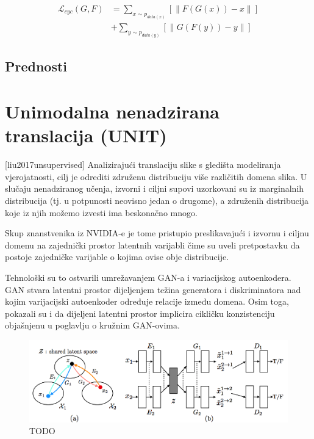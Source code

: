 \documentclass[lmodern, utf8, seminar]{fer}
\newcommand{\Lagr}{\mathcal{L}}
\begin{document}
\begin{equation}
\begin{split}
\Lagr_{cyc}(G, F) &= \sum_{x\sim p_{data(x)}}[ \parallel F(G(x)) - x \parallel ] \\
			   &+ \sum_{y\sim p_{data(y)}}[ \parallel G(F(y)) - y \parallel ]
\end{split}
\end{equation}

\subsection{Prednosti}



\newpage
\section{Unimodalna nenadzirana translacija (UNIT)} [liu2017unsupervised]
Analizirajući translaciju slike s gledišta modeliranja vjerojatnosti, cilj je odrediti združenu distribuciju više različitih domena slika. U slučaju nenadziranog učenja, izvorni i ciljni supovi uzorkovani su iz marginalnih distribucija (tj. u potpunosti neovisno jedan o drugome), a združenih distribucija koje iz njih možemo izvesti ima beskonačno mnogo.

Skup znanstvenika iz NVIDIA-e je tome pristupio preslikavajući i izvornu i ciljnu domenu na zajednički prostor latentnih varijabli čime su uveli pretpostavku da postoje zajedničke varijable o kojima ovise obje distribucije. 

Tehnološki su to ostvarili umrežavanjem GAN-a i variacijskog autoenkodera. GAN stvara latentni prostor dijeljenjem težina generatora i diskriminatora nad kojim varijacijski autoenkoder određuje relacije između domena. 
Osim toga, pokazali su \cite{liu2017unsupervised} i da dijeljeni latentni prostor implicira cikličku konzistenciju objašnjenu u poglavlju o kružnim GAN-ovima.
\newline

\begin{figure}[H]
    \centering
    \includegraphics[width=1\textwidth]{liu2017unsupervised-unit}
    \caption{ TODO }
    \label{fig:liu2017unsupervised-unit}
\end{figure}
\end{document}
